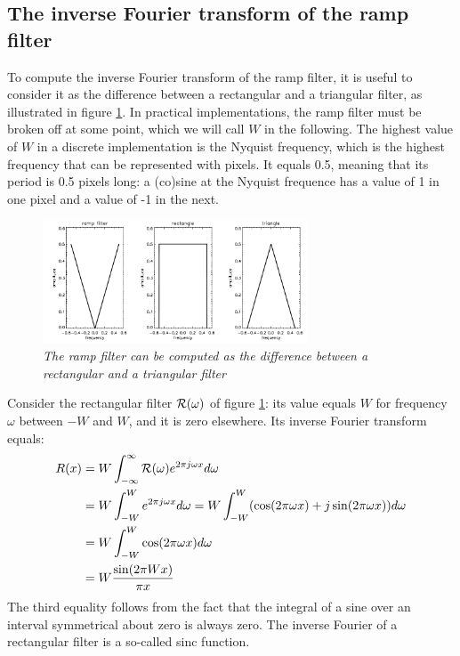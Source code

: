 \documentclass[11pt,oneside]{article}
\begin{document}
\newpage
\subsection{The inverse Fourier transform of the ramp filter} \label{app:ramp}
To compute the inverse Fourier transform of the ramp filter, it is
useful to consider it as the difference between a rectangular and a
triangular filter, as illustrated in figure \ref{fig:rampapp2}. In
practical implementations, the ramp filter must be broken off at some
point, which we will call $W$ in the following. The highest value of
$W$ in a discrete implementation is the Nyquist frequency, which is
the highest frequency that can be represented with pixels. It equals
0.5, meaning that its period is 0.5 pixels long: a (co)sine at the
Nyquist frequence has a value of 1 in one pixel and a value of -1 in
the next.

\begin{figure}[tbh]
\centering
\includegraphics[width=0.7\textwidth]{figs/fig_rampfilter2_app.pdf}
\caption{\label{fig:rampapp2} \emph{The ramp filter can be computed as
    the difference between a rectangular and a triangular filter}}
\end{figure}

Consider the rectangular filter ${\cal R}(\omega)$ of figure  \ref{fig:rampapp2}: its
value equals $W$ for frequency $\omega$ between $-W$ and $W$, and it is
zero elsewhere. Its inverse Fourier transform equals:
\begin{align}
R(x) & =  W \int_{-\infty}^{\infty} {\cal R}(\omega) e^{2\pi j \omega x} 
           d\omega \nonumber \\
 &= W \int_{-W}^W e^{2\pi j \omega x} d\omega = W \int_{-W}^W (\cos(2\pi \omega x) + j \sin(2\pi \omega x)) d\omega 
       \nonumber \\
 &= W \int_{-W}^W \cos(2\pi \omega x) d\omega \nonumber \\
 & = W \frac{\sin(2\pi W x)}{\pi x} 
\end{align}
The third equality follows from the fact that the integral of a sine
over an interval symmetrical about zero is always zero. The inverse
Fourier of a rectangular filter is a so-called sinc function.
\end{document}
